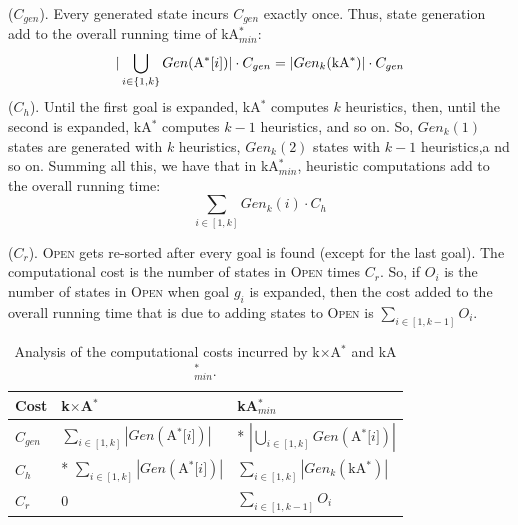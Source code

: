 \documentclass{aicom2e}
\newcommand{\kgs}{$k$GP}
\newcommand{\kastar}{kA$^*$}
\newcommand{\kastarmin}{kA$^*_{min}$}
\newcommand{\kxastar}{k$\times$A$^*$}
\newcommand{\astari}[1]{A$^*$[$#1$]}
\newcommand{\open}{\textsc{Open}}
\begin{document}
 ($C_{gen}$). Every generated state incurs
$C_{gen}$ exactly once. Thus, state generation add to the overall running time of \kastarmin{}:
\[
|\bigcup_{i\in{\{1,k\}}} Gen(\text{\astari{i}})|\cdot C_{gen} =
|Gen_k(\text{\kastar{}})|\cdot C_{gen}  \displaystyle
\]
 ($C_{h}$). 
Until the first goal is expanded, \kastar{} computes $k$ heuristics,
then, until the second is expanded, \kastar{} computes $k-1$ heuristics, and so on.
So, $Gen_k(1)$ states are generated with $k$ heuristics,
$Gen_{k}(2)$ states with $k-1$ heuristics,a nd so on. Summing all this, we have that
in \kastarmin{}, heuristic computations add to the overall running time:
\[ \sum_{i\in[1,k]} Gen_k(i)\cdot C_h \]


 ($C_r$). 
\open{} gets re-sorted after every goal is found (except for the last goal). 
The computational cost is the number of states in \open{} times $C_r$.
So, if $O_i$ is the number of states in \open{} when goal $g_i$ is expanded, then
the cost added to the overall running time that is due to adding states to \open{} is $\sum_{i\in[1,k-1]} O_i$. 

\begin{table}
    \begin{tabular}{|l|l|l|}
        \hline
        Cost        & \kxastar{}                                    & \kastarmin \\ \hline
        $C_{gen}$   & $\sum_{i\in[1,k]} |Gen(\text{\astari{i}})|$       & * $|\bigcup_{i\in[1,k]} Gen(\text{\astari{i}})|$\\
        $C_{h}$     & * $\sum_{i\in[1,k]} |Gen(\text{\astari{i}})|$     & $\sum_{i\in[1,k]} |Gen_k(\text{\kastar{}})|$\\
        $C_r$		&	0												& $\sum_{i\in[1,k-1]} O_i$\\        
        \hline
    \end{tabular}
       \caption{Analysis of the computational costs incurred by \kxastar{} and \kastarmin{}.}
   \label{tab:time-analysis}
\end{table}
\end{document}
